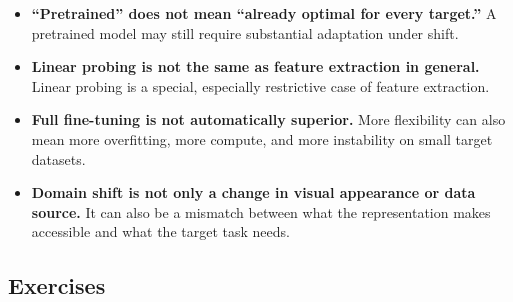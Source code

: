\begin{itemize}
    \item \textbf{``Pretrained'' does not mean ``already optimal for every target.''} A pretrained model may still require substantial adaptation under shift.
    \item \textbf{Linear probing is not the same as feature extraction in general.} Linear probing is a special, especially restrictive case of feature extraction.
    \item \textbf{Full fine-tuning is not automatically superior.} More flexibility can also mean more overfitting, more compute, and more instability on small target datasets.
    \item \textbf{Domain shift is not only a change in visual appearance or data source.} It can also be a mismatch between what the representation makes accessible and what the target task needs.
\end{itemize}

\subsection*{Exercises}

